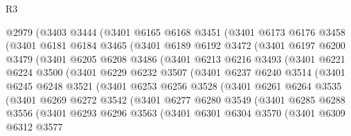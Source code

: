 \begin{lexlean}{R3}
\begin{coremodule}
    @2979
      (@3403
        @3444
        (@3401
          @6165
          @6168
          @3451
          (@3401
            @6173
            @6176
            @3458
            (@3401
              @6181
              @6184
              @3465
              (@3401
                @6189
                @6192
                @3472
                (@3401
                  @6197
                  @6200
                  @3479
                  (@3401
                    @6205
                    @6208
                    @3486
                    (@3401
                      @6213
                      @6216
                      @3493
                      (@3401
                        @6221
                        @6224
                        @3500
                        (@3401
                          @6229
                          @6232
                          @3507
                          (@3401
                            @6237
                            @6240
                            @3514
                            (@3401
                              @6245
                              @6248
                              @3521
                              (@3401
                                @6253
                                @6256
                                @3528
                                (@3401
                                  @6261
                                  @6264
                                  @3535
                                  (@3401
                                    @6269
                                    @6272
                                    @3542
                                    (@3401
                                      @6277
                                      @6280
                                      @3549
                                      (@3401
                                        @6285
                                        @6288
                                        @3556
                                        (@3401
                                          @6293
                                          @6296
                                          @3563
                                          (@3401
                                            @6301
                                            @6304
                                            @3570
                                            (@3401
                                              @6309
                                              @6312
                                              @3577

\end{coremodule}
\end{lexlean}
